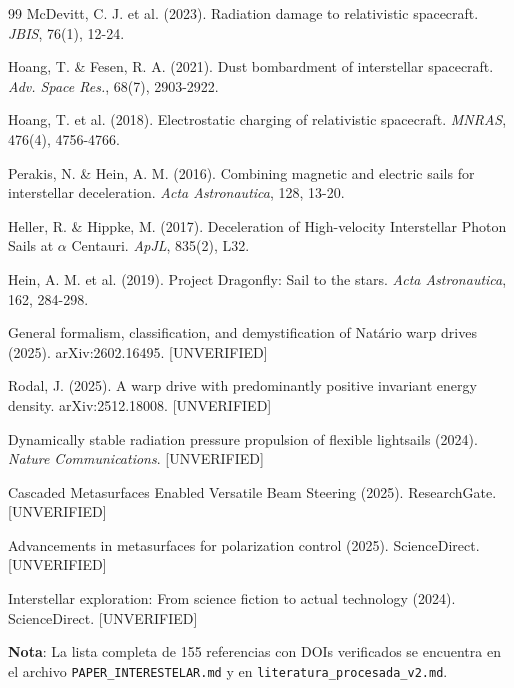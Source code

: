 \documentclass[11pt,a4paper,onecolumn]{article}
\begin{document}
\begin{thebibliography}{99}
 McDevitt, C. J. et al. (2023). Radiation damage to relativistic spacecraft. \textit{JBIS}, 76(1), 12-24.

 Hoang, T. \& Fesen, R. A. (2021). Dust bombardment of interstellar spacecraft. \textit{Adv. Space Res.}, 68(7), 2903-2922.

 Hoang, T. et al. (2018). Electrostatic charging of relativistic spacecraft. \textit{MNRAS}, 476(4), 4756-4766.

 Perakis, N. \& Hein, A. M. (2016). Combining magnetic and electric sails for interstellar deceleration. \textit{Acta Astronautica}, 128, 13-20.

 Heller, R. \& Hippke, M. (2017). Deceleration of High-velocity Interstellar Photon Sails at $\alpha$ Centauri. \textit{ApJL}, 835(2), L32.

 Hein, A. M. et al. (2019). Project Dragonfly: Sail to the stars. \textit{Acta Astronautica}, 162, 284-298.

 General formalism, classification, and demystification of Natário warp drives (2025). arXiv:2602.16495. [UNVERIFIED]

 Rodal, J. (2025). A warp drive with predominantly positive invariant energy density. arXiv:2512.18008. [UNVERIFIED]

 Dynamically stable radiation pressure propulsion of flexible lightsails (2024). \textit{Nature Communications}. [UNVERIFIED]

 Cascaded Metasurfaces Enabled Versatile Beam Steering (2025). ResearchGate. [UNVERIFIED]

 Advancements in metasurfaces for polarization control (2025). ScienceDirect. [UNVERIFIED]

 Interstellar exploration: From science fiction to actual technology (2024). ScienceDirect. [UNVERIFIED]

\end{thebibliography}

\textbf{Nota}: La lista completa de 155 referencias con DOIs verificados se encuentra en el archivo \texttt{PAPER\_INTERESTELAR.md} y en \texttt{literatura\_procesada\_v2.md}.
\end{document}
